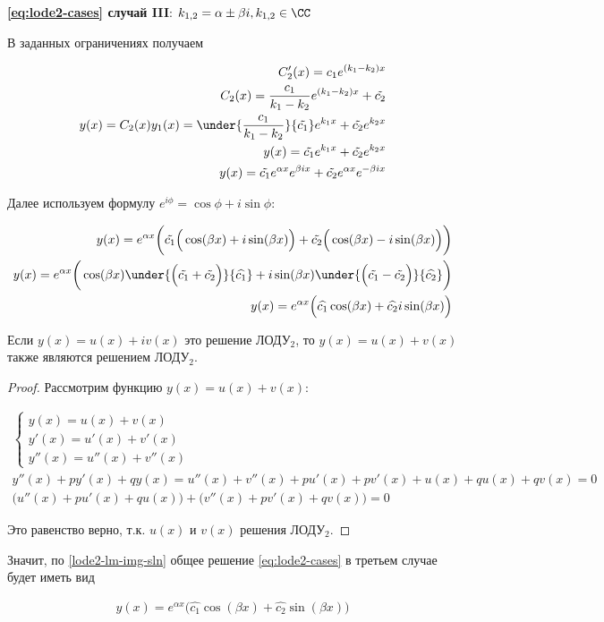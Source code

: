 
\textbf{\eqref{eq:lode2-cases} случай III}:
\(k_{1,2} = \alpha \pm \beta i, k_{1,2} \in \CC\)

В заданных ограничениях получаем

\begin{align*}
  C_{2}'(x) = c_{1} e^{(k_{1} - k_{2}) x} \\
  C_{2}(x) = \frac{c_1}{k_{1} - k_{2}} e^{(k_{1} - k_{2}) x} + \tilde{c_{2}} \\
  y(x)
  = C_{2}(x) y_{1}(x)
  = \under{\frac{c_1}{k_{1} - k_{2}}}{\tilde{c_1}} e^{k_{1} x}
  + \tilde{c_2} e^{k_{2} x} \\
  y(x) = \tilde{c_{1}} e^{k_{1}x} + \tilde{c_{2}} e^{k_{2}x} \\
  y(x)
  = \tilde{c_{1}} e^{\alpha x} e^{\beta i x}
  + \tilde{c_{2}} e^{\alpha x} e^{-\beta i x}
\end{align*}

Далее используем формулу \(e^{i \phi} = \cos \phi + i \sin \phi\):

\begin{align*}
  y(x) = e^{\alpha x} \bigg(
    \tilde{c_{1}} \Big(\cos (\beta x) + i \sin (\beta x)\Big) +
    \tilde{c_{2}} \Big(\cos (\beta x) - i \sin (\beta x)\Big)
  \bigg) \\
  y(x) = e^{\alpha x} \bigg(
    \cos (\beta x)
      \under{\Big(\tilde{c_{1}} + \tilde{c_{2}}\Big)}{\widehat{c_{1}}}
    +
    i \sin (\beta x)
    \under{\Big(\tilde{c_{1}} - \tilde{c_{2}}\Big)}{\widehat{c_{2}}}
  \bigg) \\
  y(x) = e^{\alpha x} \Big(
    \widehat{c_{1}} \cos (\beta x) +
    \widehat{c_{2}} i \sin (\beta x)
  \Big)
\end{align*}

\begin{lemma}\label{lode2-lm-img-sln}
  Если \(y(x) = u(x) + i v(x)\) это решение ЛОДУ\(_2\), то
  \(y(x) = u(x) + v(x)\) также являются решением ЛОДУ\(_2\).
\end{lemma}
\begin{proof}
  Рассмотрим функцию \(y(x) = u(x) + v(x)\):

  \begin{align*}
    \begin{cases}
      y(x) = u(x) + v(x) \\
      y'(x) = u'(x) + v'(x) \\
      y''(x) = u''(x) + v''(x)
    \end{cases} \\
    y''(x) + p y'(x) + q y(x)
    = u''(x) + v''(x) + p u'(x) + p v'(x) + u(x) + q u(x) + q v(x) = 0 \\
    \Big( u''(x) + p u'(x) + q u(x) \Big) +
    \Big( v''(x) + p v'(x) + q v(x) \Big) = 0
  \end{align*}

  Это равенство верно, т.к. \(u(x)\) и \(v(x)\) решения ЛОДУ\(_2\).
\end{proof}

Значит, по \ref{lode2-lm-img-sln} общее решение \eqref{eq:lode2-cases} в третьем
случае будет иметь вид

\begin{align*}
  y(x) = e^{\alpha x} \Big(
    \widehat{c_{1}} \cos (\beta x) +
    \widehat{c_{2}} \sin (\beta x)
  \Big)
\end{align*}



